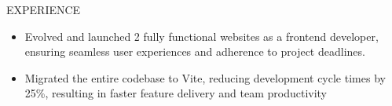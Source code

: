\documentclass{resume} %
\begin{document}
\begin{rSection}{EXPERIENCE}
\begin{itemize}
\itemsep -3pt{}
\item Evolved and launched 2 fully functional websites as a frontend developer, ensuring seamless user experiences and adherence to project deadlines.
\item Migrated the entire codebase to Vite, reducing development cycle times by 25\%, resulting in faster feature delivery and team productivity
\end{itemize}
\end{rSection}


\end{document}
